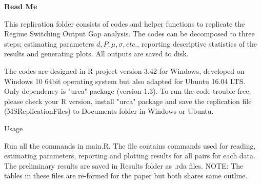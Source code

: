 \documentclass{article}
\begin{document}
\begin{center}
	\Large \bf Read Me 
\end{center}
This replication folder consists of codes and helper functions to replicate the Regime Switching Output Gap analysis. The codes can be decomposed to three steps; estimating parameters $ d,P,\mu,\sigma, etc. $, reporting descriptive statistics of the results and generating plots. All outputs are saved to disk.

The codes are designed in R project version 3.42 for Windows, developed on Windows 10 64bit operating system but also adapted for Ubuntu 16.04 LTS. Only dependency is "urca" package (version 1.3). To run the code trouble-free, please check your R version, install "urca" package and save the replication file (MSReplicationFiles) to Documents folder in Windows or Ubuntu.
\sloppy
\begin{flushleft}
	\large Usage
\end{flushleft}
Run all the commands in main.R. The file contains commands used for reading, estimating parameters, reporting and plotting results for all pairs for each data. The preliminary results are saved in Results folder as .rda files. NOTE: The tables in these files are re-formed for the paper but both shares same outline.
\end{document}
